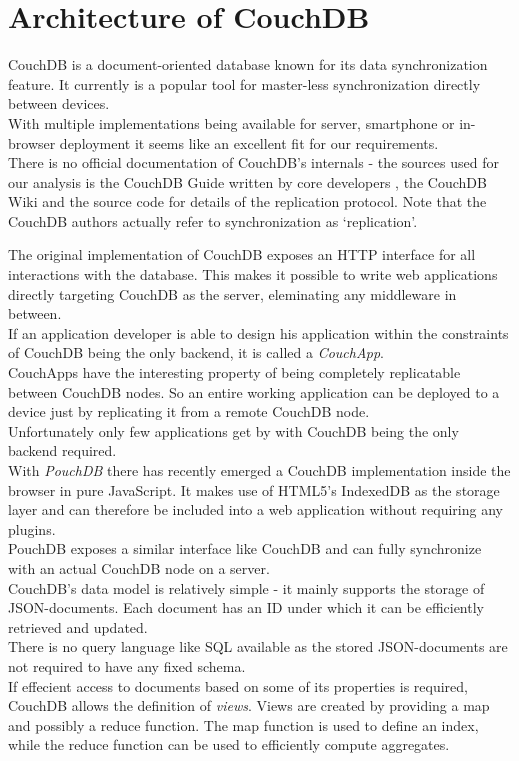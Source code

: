 
\chapter{Architecture of CouchDB}
\label{sec:couchdb}
CouchDB is a document-oriented database known for its data synchronization feature.
It currently is a popular tool for master-less synchronization directly between devices.\\
With multiple implementations being available for server, smartphone or in-browser deployment it seems like an excellent fit for our requirements.\\
There is no official documentation of CouchDB's internals - the sources used for our analysis is the CouchDB Guide written by core developers \cite{anderson2010couchdb}, the CouchDB Wiki \cite{couchdb_wiki} and the source code \cite{couchdb_source} for details of the replication protocol.
Note that the CouchDB authors actually refer to synchronization as `replication'.

The original implementation of CouchDB exposes an HTTP interface for all interactions with the database.
This makes it possible to write web applications directly targeting CouchDB as the server, eleminating any middleware in between.\\
If an application developer is able to design his application within the constraints of CouchDB being the only backend, it is called a \emph{CouchApp}.\\
CouchApps have the interesting property of being completely replicatable between CouchDB nodes.
So an entire working application can be deployed to a device just by replicating it from a remote CouchDB node.\\
Unfortunately only few applications get by with CouchDB being the only backend required.\\

With \emph{PouchDB} there has recently emerged a CouchDB implementation inside the browser in pure JavaScript.
It makes use of HTML5's IndexedDB as the storage layer and can therefore be included into a web application without requiring any plugins.\\
PouchDB exposes a similar interface like CouchDB and can fully synchronize with an actual CouchDB node on a server.\\

CouchDB's data model is relatively simple - it mainly supports the storage of JSON-documents.
Each document has an ID under which it can be efficiently retrieved and updated.\\
There is no query language like SQL available as the stored JSON-documents are not required to have any fixed schema.\\
If effecient access to documents based on some of its properties is required, CouchDB allows the definition of \emph{views}.
Views are created by providing a map and possibly a reduce function.
The map function is used to define an index, while the reduce function can be used to efficiently compute aggregates.\\

